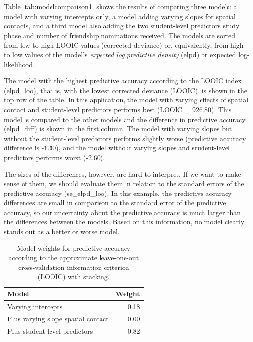 \documentclass[
  english,
  doc]{apa6}
\begin{document}
Table \ref{tab:modelcomparison1} shows the results of comparing three models: a model with varying intercepts only, a model adding varying slopes for spatial contacts, and a third model also adding the two student-level predictors study phase and number of friendship nominations received. The models are sorted from low to high LOOIC values (corrected deviance) or, equivalently, from high to low values of the model's \emph{expected log predictive density} (elpd) or expected log-likelihood.

The model with the highest predictive accuracy according to the LOOIC index (elpd\_loo), that is, with the lowest corrected deviance (LOOIC), is shown in the top row of the table. In this application, the model with varying effects of spatial contact and student-level predictors performs best (LOOIC = 926.80). This model is compared to the other models and the difference in predictive accuracy (elpd\_diff) is shown in the first column. The model with varying slopes but without the student-level predictors performs slightly worse (predictive accuracy difference is -1.60), and the model without varying slopes and student-level predictors performs worst (-2.60).

The sizes of the differences, however, are hard to interpret. If we want to make sense of them, we should evaluate them in relation to the standard errors of the predictive accuracy (se\_elpd\_loo). In this example, the predictive accuracy differences are small in comparison to the standard error of the predictive accuracy, so our uncertainty about the predictive accuracy is much larger than the differences between the models. Based on this information, no model clearly stands out as a better or worse model.

\begin{table}

\caption{\label{tab:modelcomparison2}Model weights for predictive accuracy according to the approximate leave-one-out cross-validation information criterion (LOOIC) with stacking.}
\centering
\fontsize{12}{14}\selectfont
\begin{tabular}[t]{lr}
\toprule
Model & Weight\\
\midrule
Varying intercepts & 0.18\\
Plus varying slope spatial contact & 0.00\\
Plus student-level predictors & 0.82\\
\bottomrule
\end{tabular}
\end{table}
\end{document}
